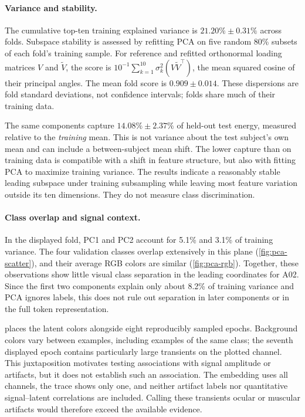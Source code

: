 \documentclass{article}
\begin{document}
\paragraph{Variance and stability.}
The cumulative top-ten training explained variance is $21.20\%\pm0.31\%$ across folds. Subspace stability is assessed
by refitting PCA on five random 80\% subsets of each fold's training
sample. For reference and refitted orthonormal loading matrices $V$ and
$\widetilde V$, the score is
$10^{-1}\sum_{k=1}^{10}\sigma_k^2(V\widetilde V^\top)$, the mean squared
cosine of their principal angles. The mean fold score is
$0.909\pm0.014$. These dispersions are fold standard deviations, not
confidence intervals; folds share much of their training data.

The same components capture $14.08\%\pm2.37\%$ of held-out test energy,
measured relative to the \emph{training} mean. This is not variance about
the test subject's own mean and can include a between-subject mean shift.
The lower capture than on training data is compatible with a shift in
feature structure, but also with fitting PCA to maximize training variance.
The results indicate a reasonably stable leading subspace under training
subsampling while leaving most feature variation outside its ten dimensions.
They do not measure class discrimination.

\paragraph{Class overlap and signal context.}
In the displayed fold, PC1 and PC2 account for 5.1\% and 3.1\% of training
variance. The four validation classes overlap extensively in this plane
(\cref{fig:pca-scatter}), and their average RGB colors are similar
(\cref{fig:pca-rgb}). Together, these observations show little visual class
separation in the leading coordinates for A02. Since the first two
components explain only about 8.2\% of training variance and PCA ignores
labels, this does not rule out separation in later components or in the
full token representation.

 places the latent colors alongside eight reproducibly
sampled epochs. Background colors vary between examples, including examples
of the same class; the seventh displayed epoch contains particularly large
transients on the plotted channel. This juxtaposition motivates testing
associations with signal amplitude or artifacts, but it does not establish
such an association. The embedding uses all channels, the trace shows only
one, and neither artifact labels nor quantitative signal--latent correlations
are included. Calling these transients ocular or muscular artifacts would
therefore exceed the available evidence.
\end{document}
